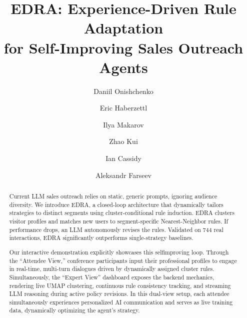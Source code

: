 \documentclass[sigconf]{acmart}
\begin{document}
\title{EDRA: Experience-Driven Rule Adaptation \\ for Self-Improving Sales Outreach Agents}

\author{Daniil Onishchenko}

\author{Eric Haberzettl}

\author{Ilya Makarov}

\author{Zhao Kui}

\author{Ian Cassidy}

\author{Aleksandr Farseev}

\begin{abstract}
Current LLM sales outreach relies on static, generic prompts, ignoring audience diversity. We introduce EDRA, a closed-loop architecture that dynamically tailors strategies to distinct segments using
cluster-conditional rule induction. EDRA clusters visitor profiles
and matches new users to segment-specific Nearest-Neighbor rules.
If performance drops, an LLM autonomously revises the rules. Validated on 744 real interactions, EDRA significantly outperforms
single-strategy baselines.

Our interactive demonstration explicitly showcases this selfimproving loop. Through the “Attendee View,” conference participants input their professional profiles to engage in real-time,
multi-turn dialogues driven by dynamically assigned cluster rules.
Simultaneously, the “Expert View” dashboard exposes the backend mechanics, rendering live UMAP clustering, continuous rule
consistency tracking, and streaming LLM reasoning during active
policy revisions. In this dual-view setup, each attendee simultaneously experiences personalized AI communication and serves as
live training data, dynamically optimizing the agent’s strategy.
\end{abstract}
\end{document}
